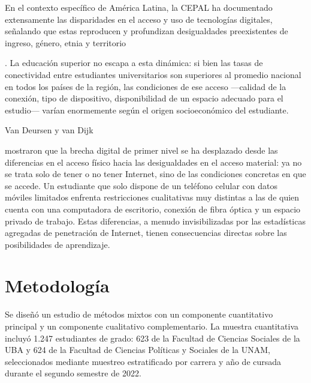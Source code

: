     
    En el contexto específico de América Latina, la CEPAL ha documentado extensamente las disparidades en el acceso y uso de tecnologías digitales, señalando que estas reproducen y profundizan desigualdades preexistentes de ingreso, género, etnia y territorio 
    
    \autocite{2556-CEPAL2021}
    
    . La educación superior no escapa a esta dinámica: si bien las tasas de conectividad entre estudiantes universitarios son superiores al promedio nacional en todos los países de la región, las condiciones de ese acceso —calidad de la conexión, tipo de dispositivo, disponibilidad de un espacio adecuado para el estudio— varían enormemente según el origen socioeconómico del estudiante.
   
   


    
    Van Deursen y van Dijk 
    
    \autocite{2557-VANDEURSEN2019}
    
     mostraron que la brecha digital de primer nivel se ha desplazado desde las diferencias en el acceso físico hacia las desigualdades en el acceso material: ya no se trata solo de tener o no tener Internet, sino de las condiciones concretas en que se accede. Un estudiante que solo dispone de un teléfono celular con datos móviles limitados enfrenta restricciones cualitativas muy distintas a las de quien cuenta con una computadora de escritorio, conexión de fibra óptica y un espacio privado de trabajo. Estas diferencias, a menudo invisibilizadas por las estadísticas agregadas de penetración de Internet, tienen consecuencias directas sobre las posibilidades de aprendizaje.
   
   


\section{Metodología}

    
    Se diseñó un estudio de métodos mixtos con un componente cuantitativo principal y un componente cualitativo complementario. La muestra cuantitativa incluyó 1.247 estudiantes de grado: 623 de la Facultad de Ciencias Sociales de la UBA y 624 de la Facultad de Ciencias Políticas y Sociales de la UNAM, seleccionados mediante muestreo estratificado por carrera y año de cursada durante el segundo semestre de 2022.
   
   



